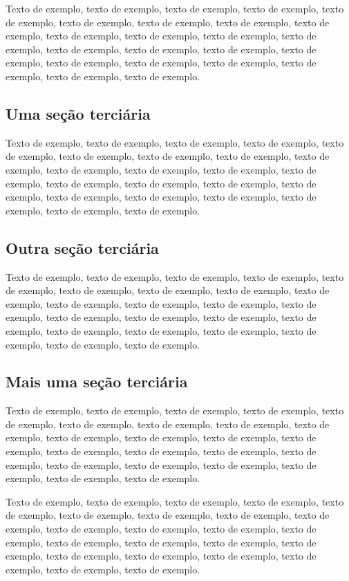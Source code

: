 \documentclass[
	12pt,				%
	oneside,			%
	a4paper,			%
	english,			%
	brazil				%
	]{abntex2ppgsi}
\begin{document}
Texto de exemplo, texto de exemplo, texto de exemplo, texto de exemplo, texto de exemplo, texto de exemplo, texto de exemplo, texto de exemplo, texto de exemplo, texto de exemplo, texto de exemplo, texto de exemplo, texto de exemplo, texto de exemplo, texto de exemplo, texto de exemplo, texto de exemplo, texto de exemplo, texto de exemplo, texto de exemplo, texto de exemplo, texto de exemplo, texto de exemplo.

\subsection{Uma seção terciária}

Texto de exemplo, texto de exemplo, texto de exemplo, texto de exemplo, texto de exemplo, texto de exemplo, texto de exemplo, texto de exemplo, texto de exemplo, texto de exemplo, texto de exemplo, texto de exemplo, texto de exemplo, texto de exemplo, texto de exemplo, texto de exemplo, texto de exemplo, texto de exemplo, texto de exemplo, texto de exemplo, texto de exemplo, texto de exemplo, texto de exemplo.


\subsection{Outra seção terciária}

Texto de exemplo, texto de exemplo, texto de exemplo, texto de exemplo, texto de exemplo, texto de exemplo, texto de exemplo, texto de exemplo, texto de exemplo, texto de exemplo, texto de exemplo, texto de exemplo, texto de exemplo, texto de exemplo, texto de exemplo, texto de exemplo, texto de exemplo, texto de exemplo, texto de exemplo, texto de exemplo, texto de exemplo, texto de exemplo, texto de exemplo.

\subsection{Mais uma seção terciária}

Texto de exemplo, texto de exemplo, texto de exemplo, texto de exemplo, texto de exemplo, texto de exemplo, texto de exemplo, texto de exemplo, texto de exemplo, texto de exemplo, texto de exemplo, texto de exemplo, texto de exemplo, texto de exemplo, texto de exemplo, texto de exemplo, texto de exemplo, texto de exemplo, texto de exemplo, texto de exemplo, texto de exemplo, texto de exemplo, texto de exemplo.

Texto de exemplo, texto de exemplo, texto de exemplo, texto de exemplo, texto de exemplo, texto de exemplo, texto de exemplo, texto de exemplo, texto de exemplo, texto de exemplo, texto de exemplo, texto de exemplo, texto de exemplo, texto de exemplo, texto de exemplo, texto de exemplo, texto de exemplo, texto de exemplo, texto de exemplo, texto de exemplo, texto de exemplo, texto de exemplo, texto de exemplo.
\end{document}
